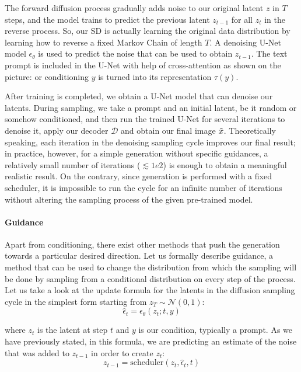 The forward diffusion process gradually adds noise to our original latent $z$ in $T$ steps, and the model trains to predict the previous latent $z_{t-1}$ for all $z_t$ in the reverse process.
So, our SD is actually learning the original data distribution by learning how to reverse a fixed Markov Chain of length $T$.
A denoising U-Net model $\epsilon_\theta$ is used to predict the noise that can be used to obtain $z_{t-1}$.
The text prompt is included in the U-Net with help of cross-attention as shown on the picture: or conditioning $y$ is turned into its representation $\tau(y)$.

After training is completed, we obtain a U-Net model that can denoise our latents.
During sampling, we take a prompt and an initial latent, be it random or somehow conditioned, and then run the trained U-Net for several iterations to denoise it, apply our decoder $\mathcal{D}$ and obtain our final image $\Tilde{x}$.
Theoretically speaking, each iteration in the denoising sampling cycle improves our final result; in practice, however, for a simple generation without specific guidances, a relatively small number of iterations ($\lesssim 1e2$) is enough to obtain a meaningful realistic result.
On the contrary, since generation is performed with a fixed scheduler, it is impossible to run the cycle for an infinite number of iterations without altering the sampling process of the given pre-trained model.

\paragraph{Guidance}\label{sec:guidance}
Apart from conditioning, there exist other methods that push the generation towards a particular desired direction.
Let us formally describe guidance, a method that can be used to change the distribution from which the sampling will be done by sampling from a conditional distribution on every step of the process.
Let us take a look at the update formula for the latents in the diffusion sampling cycle in the simplest form starting from $z_T \sim \mathcal{N}(0, 1)$:
$$\hat\epsilon_t = \epsilon_\theta(z_t;t,y)$$

where $z_t$ is the latent at step $t$ and $y$ is our condition, typically a prompt.
As we have previously stated, in this formula, we are predicting an estimate of the noise that was added to $z_{t-1}$ in order to create $z_t$:
$$z_{t-1} = \text{scheduler}(z_t, \hat\epsilon_t, t)$$

